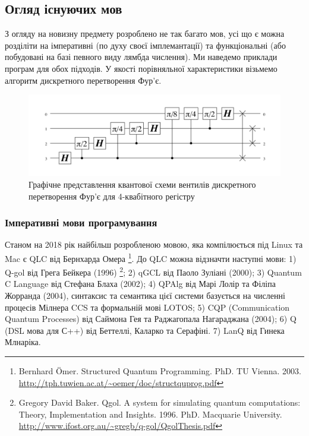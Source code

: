 \documentclass{article}
\theoremstyle{definition}
\begin{document}
\newpage
\subsection{Огляд існуючих мов}
З огляду на новизну предмету розроблено не так багато мов, усі що є можна розділіти
на імперативні (по духу своєї імплемантації) та функціональні (або побудовані на базі певного виду
лямбда числення). Ми наведемо приклади програм для обох підходів.
У якості порівняльної характеристики візьмемо алгоритм дискретного перетворення Фур'є.

\begin{figure}[h]
  \centerline{\includegraphics[scale=0.3]{fourier.png}}
  \caption{Графічне представлення квантової схеми вентилів дискретного перетворення Фур'є для 4-квабітного регістру}
\end{figure}

\newpage
\subsubsection{Імперативні мови програмування}
Станом на 2018 рік найбільш розробленою мовою, яка компілюється під Linux та Mac
є QLC від Бернхарда Омера
\footnote{Bernhard Ömer. Structured Quantum Programming. PhD. TU Vienna. 2003.
          \url{http://tph.tuwien.ac.at/~oemer/doc/structquprog.pdf}}.
До QLC можна відзначти наступні мови:
1) Q-gol від Грега Бейкера (1996)
   \footnote{Gregory David Baker.
             Qgol. A system for simulating quantum computations:
             Theory, Implementation and Insights. 1996. PhD. Macquarie University. \\
             \url{http://www.ifost.org.au/~gregb/q-gol/QgolThesis.pdf}};
2) qGCL від Паоло Зуліані (2000)\cite{Sanders2000};
3) Quantum C Language від Стефана Блаха (2002);
4) QPAlg від Марі Лолір та Філіпа Жорранда (2004)\cite{Lalire2004}, синтаксис та семантика цієї системи базується на численні процесів Мілнера CCS та формальній мові LOTOS;
5) CQP (Communication Quantum Processes) від Саймона Гея та Раджагопала Нагараджана (2004)\cite{Gay2005};
6) Q (DSL мова для С++) від Беттеллі, Каларко та Серафіні\cite{}.
7) LanQ від Гинека Млнаріка\cite{Mlnarik2007}.
\end{document}
